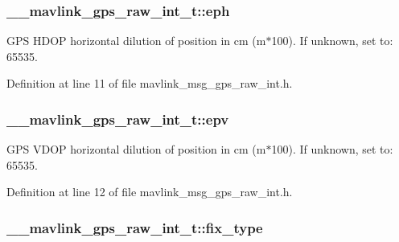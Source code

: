 \hypertarget{struct____mavlink__gps__raw__int__t_ad7ec0749ffe37d3ada65b701be2cd305}{
\subsubsection[{eph}]{ \-\_\-\-\_\-mavlink\-\_\-gps\-\_\-raw\-\_\-int\-\_\-t\-::eph}}\label{struct____mavlink__gps__raw__int__t_ad7ec0749ffe37d3ada65b701be2cd305}


G\-P\-S H\-D\-O\-P horizontal dilution of position in cm (m$\ast$100). If unknown, set to\-: 65535. 



Definition at line 11 of file mavlink\-\_\-msg\-\_\-gps\-\_\-raw\-\_\-int.\-h.

\hypertarget{struct____mavlink__gps__raw__int__t_a0d50bc6cc0e56d9f49885e3e550ec944}{
\subsubsection[{epv}]{ \-\_\-\-\_\-mavlink\-\_\-gps\-\_\-raw\-\_\-int\-\_\-t\-::epv}}\label{struct____mavlink__gps__raw__int__t_a0d50bc6cc0e56d9f49885e3e550ec944}


G\-P\-S V\-D\-O\-P horizontal dilution of position in cm (m$\ast$100). If unknown, set to\-: 65535. 



Definition at line 12 of file mavlink\-\_\-msg\-\_\-gps\-\_\-raw\-\_\-int.\-h.

\hypertarget{struct____mavlink__gps__raw__int__t_ae014afb6eea2b6033ebde37c79e120f2}{
\subsubsection[{fix\-\_\-type}]{ \-\_\-\-\_\-mavlink\-\_\-gps\-\_\-raw\-\_\-int\-\_\-t\-::fix\-\_\-type}}\label{struct____mavlink__gps__raw__int__t_ae014afb6eea2b6033ebde37c79e120f2}


